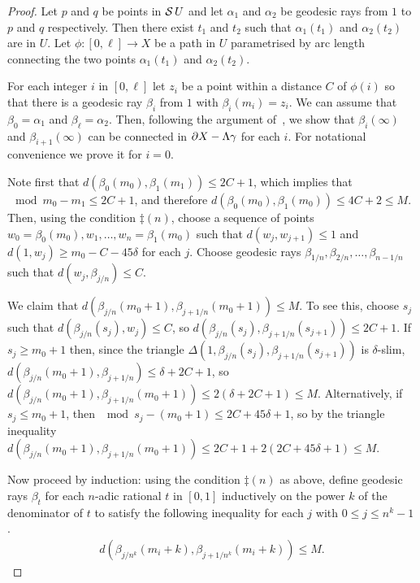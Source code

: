 \begin{proof} 
  Let $p$ and $q$ be points in $\operatorname{\mathcal{S}} U$ and let $\alpha_1$ and $\alpha_2$ be geodesic rays from $1$ to $p$ and $q$ respectively. 
  Then there exist $t_1$ and $t_2$ such that $\alpha_1(t_1)$ and $\alpha_2(t_2)$ are in $U$. 
  Let $\phi\colon [0,\ell] \to X$ be a path in $U$ parametrised by arc length connecting the two points $\alpha_1(t_1)$ and $\alpha_2(t_2)$.

  For each integer $i$ in $[0,\ell]$ let $z_i$ be a point within a distance $C$ of $\phi(i)$ so that there is a geodesic ray $\beta_i$ from $1$ with $\beta_i(m_i) = z_i$. 
  We can assume that $\beta_0 = \alpha_1$ and $\beta_\ell = \alpha_2$.  
  Then, following the argument of~\cite[Proposition 3.2]{bestvinamess91}, we show that $\beta_i(\infty)$ and $\beta_{i+1}(\infty)$ can be connected in $\partial X - \Lambda\gamma$ for each $i$. 
  For notational convenience we prove it for $i=0$.

  Note first that $d(\beta_0(m_0), \beta_1(m_1)) \leq 2C + 1$, which implies that $\mod{m_0 - m_1} \leq 2C+1$, and therefore $d(\beta_0(m_0), \beta_1(m_0)) \leq 4C + 2 \leq M$.
  Then, using the condition $\ddag(n)$, choose a sequence of points $w_0 = \beta_0(m_0),w_1,\dotsc,w_n=\beta_1(m_0)$ such that $d(w_j,w_{j+1}) \leq 1$ and $d(1, w_j) \geq m_0 - C - 45\delta$ for each $j$.
  Choose geodesic rays $\beta_{1/n},\beta_{2/n},\dotsc,\beta_{n-1/n}$ such that $d(w_j, \beta_{j/n}) \leq C$.

  We claim that $d(\beta_{j/n}(m_0 + 1), \beta_{j+1/n}(m_0 + 1)) \leq M$.
  To see this, choose $s_j$ such that $d(\beta_{j/n}(s_j), w_j) \leq C$, so $d(\beta_{j/n}(s_j), \beta_{j+1/n}(s_{j+1})) \leq 2C + 1$.
  If $s_j \geq m_0 + 1$ then, since the triangle $\Delta(1, \beta_{j/n}(s_j), \beta_{j+1/n}(s_{j+1}))$ is $\delta$-slim, $d(\beta_{j/n}(m_0 + 1), \beta_{j+1/n}) \leq \delta + 2C + 1$, so $d(\beta_{j/n}(m_0 + 1), \beta_{j+1/n}(m_0 +1)) \leq 2(\delta + 2C + 1) \leq M$.
  Alternatively, if $s_j \leq m_0 + 1$, then $\mod{s_j - (m_0 + 1)} \leq 2C + 45\delta + 1$, so by the triangle inequality $d(\beta_{j/n}(m_0 + 1), \beta_{j+1/n}(m_0 + 1)) \leq 2C + 1 + 2(2C + 45\delta + 1) \leq M$.

  Now proceed by induction: using the condition $\ddag(n)$ as above, define geodesic rays $\beta_t$ for each $n$-adic rational $t$ in $[0, 1]$ inductively on the power $k$ of the denominator of $t$ to satisfy the following inequality for each $j$ with $0 \leq j \leq n^k-1$.
  \begin{align} 
    d\left(\beta_{j/n^k}(m_i + k), \beta_{j+1/n^k}(m_i + k)\right) \leq M.
  \end{align}


\end{proof}
